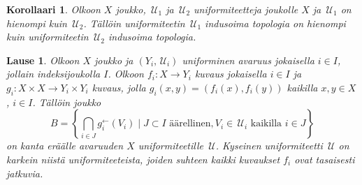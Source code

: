 \documentclass[12pt,a4paper,leqno]{report}
\newcommand{\N}{\mathbb{N}}
\newcommand{\U}{\,\mathcal{U}}
\theoremstyle{plain}
\newtheorem{lause}[equation]{Lause}
\newtheorem{kor}[equation]{Korollaari}
\theoremstyle{definition}
\theoremstyle{remark}
\begin{document}
\begin{kor}
Olkoon $X$ joukko, $\U_1$ ja $\U_2$ uniformiteetteja joukolle $X$ ja 
$\U_1$ on hienompi kuin $\U_2$. 
Tällöin uniformiteetin $\U_1$ indusoima topologia on hienompi kuin 
uniformiteetin $\U_2$ indusoima topologia.
\end{kor}
\begin{lause}\label{kuvausperheen indusoima lause}
Olkoon $X$ joukko ja $(Y_i,\U_i)$ uniforminen avaruus jokaisella $i\in I$, jollain indeksijoukolla $I$. 
Olkoon $f_i\colon X\rightarrow Y_i$ kuvaus jokaisella $i\in I$ ja  
$g_i\colon X\times X\rightarrow Y_i\times Y_i$ kuvaus, jolla $g_i(x,y)=(f_i(x), f_i(y))$ kaikilla $x,y\in X$, 
$i\in I$.
Tällöin joukko 
$$B=\left\{\bigcap_{i\in J}g^{\leftarrow}_{i}(V_{i})
\mid J\subset I\text{ äärellinen},V_{i} \in\U_{i}\text{ kaikilla } i\in J\right\}$$
on kanta eräälle avaruuden $X$ uniformiteetille $\U$. 
Kyseinen uniformiteetti $\U$ on karkein niistä uniformiteeteista, 
joiden suhteen kaikki kuvaukset $f_i$ ovat tasaisesti jatkuvia.


\end{lause}
\end{document}
